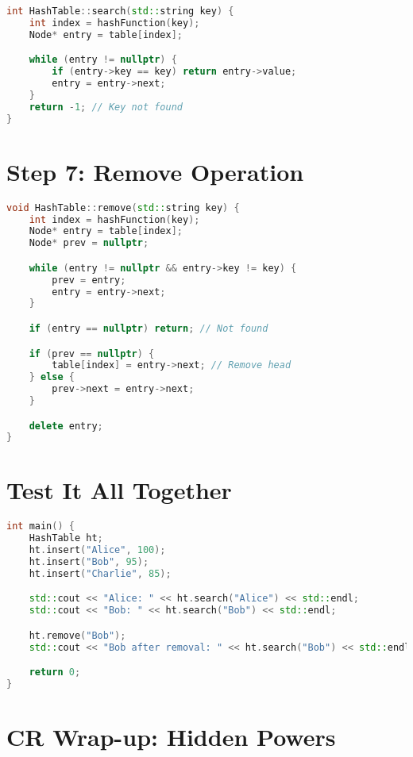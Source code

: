 \documentclass{article}
\begin{document}
\begin{lstlisting}[language=C++]
int HashTable::search(std::string key) {
    int index = hashFunction(key);
    Node* entry = table[index];

    while (entry != nullptr) {
        if (entry->key == key) return entry->value;
        entry = entry->next;
    }
    return -1; // Key not found
}
\end{lstlisting}

\section*{Step 7: Remove Operation}

\begin{lstlisting}[language=C++]
void HashTable::remove(std::string key) {
    int index = hashFunction(key);
    Node* entry = table[index];
    Node* prev = nullptr;

    while (entry != nullptr && entry->key != key) {
        prev = entry;
        entry = entry->next;
    }

    if (entry == nullptr) return; // Not found

    if (prev == nullptr) {
        table[index] = entry->next; // Remove head
    } else {
        prev->next = entry->next;
    }

    delete entry;
}
\end{lstlisting}

\section*{Test It All Together}

\begin{lstlisting}[language=C++, caption={Main function to test the hash table}]
int main() {
    HashTable ht;
    ht.insert("Alice", 100);
    ht.insert("Bob", 95);
    ht.insert("Charlie", 85);

    std::cout << "Alice: " << ht.search("Alice") << std::endl;
    std::cout << "Bob: " << ht.search("Bob") << std::endl;

    ht.remove("Bob");
    std::cout << "Bob after removal: " << ht.search("Bob") << std::endl;

    return 0;
}
\end{lstlisting}

\section*{CR Wrap-up: Hidden Powers}
\end{document}

